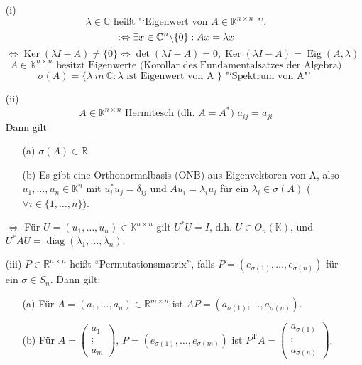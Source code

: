 \documentclass[11pt]{scrartcl}
\newcommand*{\T}{\mathrm T}
\DeclareMathOperator*{\diag}{\mathrm{diag}}
\DeclareMathOperator*{\Ker}{\mathrm{Ker}}
\DeclareMathOperator*{\Eig}{\mathrm{Eig}}
\theoremstyle{break}
\theoremstyle{remark}
\begin{document}
\begin{enumerate}
\item[(i)]
\[
\lambda \in \mathbb{C}\text{ heißt "`Eigenwert von } A \in
\mathbb{K}^{n \times n} \text{ "'.} \]
\[
: \Leftrightarrow \exists x \in \mathbb{C}^n \backslash \{0\}: Ax = \lambda x \\
\]\[
\Leftrightarrow \Ker (\lambda I -A) \neq \{0\} \Leftrightarrow
\det (\lambda I -A) = 0, \Ker (\lambda I-A) = \Eig(A, \lambda)
\]\[
A \in \mathbb{K}^{n \times n} \text{ besitzt Eigenwerte (Korollar des
Fundamentalsatzes der Algebra)}
\]\[
\sigma (A) = \{ \lambda \ in~ \mathbb{C}: \lambda \text{ ist Eigenwert
von A } \} \text{ "`Spektrum von A"' }
\]
\item[(ii)]
\[
A \in \mathbb{K}^{n \times n} \text{ Hermitesch (dh. } A = A^\ast \text{) } a_{ij} = \bar{a_{ji}}
\]
Dann gilt
\begin{enumerate}
\item[(a)]
$ \sigma(A) \in \mathbb{R}$
\item[(b)]
Es gibt eine Orthonormalbasis (ONB) aus Eigenvektoren von A, also  $u_1, \dots, u_n \in \mathbb{K}^n$ mit $u_i^{*} u_j = \delta_{ij}$
und $Au_i = \lambda_i u_i$ für ein $\lambda_i \in \sigma(A)$
($\forall i \in \{1, \dots, n\}$).
\end{enumerate}
$\Leftrightarrow$ Für $U = (u_1, \dots, u_n) \in \mathbb{K}^{n\times n}$ gilt $U^\ast U = I$,
d.h. $U \in O_n(\mathbb{K})$, und
$U^\ast A U = \diag(\lambda_1, \dots, \lambda_n).$
\item[(iii)]
$P \in \mathbb{R}^{n \times n}$ heißt "`Permutationsmatrix"',
falls $P=(e_{\sigma(1)}, \dots, e_{\sigma(n)})$ für ein $\sigma \in S_n$.
Dann gilt:
\begin{enumerate}
  \item[(a)] Für $A = (a_1, \dots, a_n) \in \mathbb{R}^{m \times n}$ ist
  $AP = (a_{\sigma(1)},\dots, a_{\sigma(n)}).$
  \item[(b)]
  Für $A = \begin{pmatrix} a_1 \\ \vdots \\ a_m \end{pmatrix}$,
      $P = (e_{\sigma(1)}, \dots, e_{\sigma(m)})$
  ist $P^\T A = \begin{pmatrix} a_{\sigma(1)} \\ \vdots \\ a_{\sigma(n)} \end{pmatrix}.$
\end{enumerate}
\end{enumerate}
\end{document}
